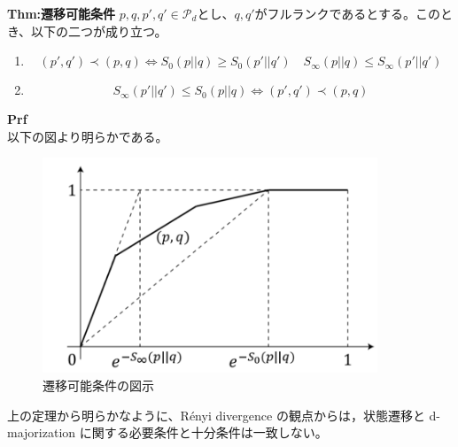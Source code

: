 \documentclass[a4paper,11pt]{jsarticle}
\numberwithin{equation}{section}
\begin{document}
\begin{itembox}[l]{\textbf{Thm:遷移可能条件}}
    $p,q,p',q' \in \mathcal{P}_d$とし、$q,q'$がフルランクであるとする。このとき、以下の二つが成り立つ。
    \begin{enumerate}
        \item
        \begin{equation}
            (p',q') \prec (p,q) \Leftrightarrow S_0(p||q) \geq S_0(p'||q') \quad S_{\infty}(p||q) \leq S_{\infty}(p'||q')
        \end{equation}
        \item
        \begin{equation}
            S_{\infty}(p'||q') \leq S_{0}(p||q) \Leftrightarrow (p',q') \prec (p,q)
        \end{equation}
    \end{enumerate}

\end{itembox}
\textbf{Prf}\\
以下の図より明らかである。%
\begin{figure}[H]
    \begin{center}
    \includegraphics[width=100mm]{image3.png}
    \end{center}
    \caption{遷移可能条件の図示}
    \label{fig:three}
\end{figure}
上の定理から明らかなように、Rényi divergence の観点からは，状態遷移と d-majorization に関する必要条件と十分条件は一致しない。\\

\end{document}
